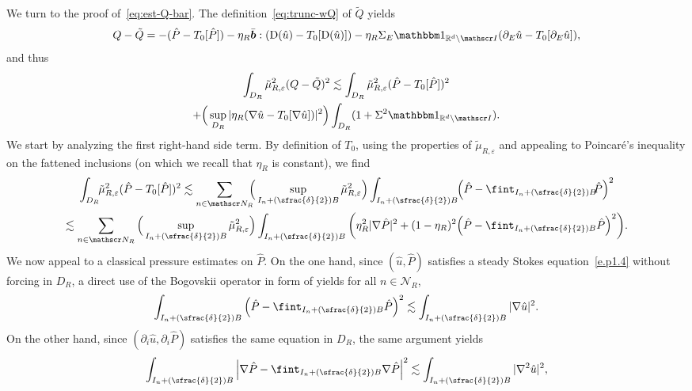 \documentclass[JEP,XML,SOM,Unicode,published]{cedram}
\let\mathcal\mathscr
\newcommand{\Psfrac}[2]{(\sfrac{#1}{#2})}
\let\mathds\mathbbm
\theoremstyle{plain}
\theoremstyle{definition}
\newcommand{\e}{\varepsilon}
\newcommand{\R}{\mathbb R}
\newcommand{\Ic}{\mathcal I}
\newcommand{\Nc}{\mathcal N}
\newcommand{\D}{\operatorname{D}}
\newcommand{\bb}{\bar{\boldsymbol b}}
\begin{document}
We turn to the proof of~\eqref{eq:est-Q-bar}.
The definition~\eqref{eq:trunc-wQ} of $\tilde Q$ yields
\begin{equation*}
Q-\tilde Q=-(\hat P-T_0[\hat P])-\eta_R\bb:(\D(\hat u)- T_0[\D(\hat u)])-\eta_R\Sigma_E\mathds1_{\R^d\setminus\Ic}(\partial_E\hat u-T_0[\partial_E\hat u]),
\end{equation*}
and thus
\begin{multline}\label{e.p1.11+}
\int_{D_R}\tilde\mu_{R,\e}^2(Q-\tilde Q)^2\lesssim \int_{D_R}\tilde\mu_{R,\e}^2(\hat P-T_0[\hat P])^2\\
+\Big(\sup_{D_R}|\eta_R(\nabla\hat u- T_0[\nabla\hat u])|^2\Big)\int_{D_R}(1+\Sigma^2\mathds1_{\R^d\setminus\Ic}).
\end{multline}
We start by analyzing the first right-hand side term. By definition of $T_0$, using the properties of $\tilde\mu_{R,\e}$ and appealing to Poincaré's inequality on the fattened inclusions (on which we recall that $\eta_R$ is constant), we find
\begin{multline}\label{eq:bnd-hatPdiffT0}
\int_{D_R}\hspace*{-1mm}\tilde\mu_{R,\e}^2(\hat P-T_0[\hat P])^2\lesssim \sum_{n\in\Nc_R}\hspace*{-2mm}\Big(\sup_{I_n+\Psfrac\delta2 B}\tilde\mu_{R,\e}^2\Big)\int_{I_n+\Psfrac\delta2 B}\hspace*{-1mm}\Big(\hat P-\fint_{I_n+\Psfrac\delta2 B}\hspace*{-1mm}\hat P\Big)^2\\
\lesssim \sum_{n\in\Nc_R}\Big(\sup_{I_n+\Psfrac\delta2 B}\tilde\mu_{R,\e}^2\Big)\int_{I_n+\Psfrac\delta2 B}\bigg(\eta_R^2|\nabla\hat P|^2+(1-\eta_R)^2\Big(\hat P-\fint_{I_n+\Psfrac\delta2 B}\hat P\Big)^2\bigg).
\end{multline}
We now appeal to a classical pressure estimates on $\hat P$.
On the one hand, since $(\hat u,\hat P)$ satisfies a steady Stokes equation~\eqref{e.p1.4} without forcing in $D_R$, a direct use of the Bogovskii operator in form of \eg \cite[Th.\,III.3.1]{Galdi} yields for all $n\in\Nc_R$,
\begin{equation}\label{eq:bnd-hatPdiff}
\int_{I_n+\Psfrac\delta2 B}\Big(\hat P-\fint_{I_n+\Psfrac\delta2 B} \hat P\Big)^2\lesssim \int_{I_n+\Psfrac\delta2 B}|\nabla \hat u|^2.
\end{equation}
On the other hand, since $(\partial_i\hat u,\partial_i\hat P)$ satisfies the same equation in $D_R$, the same argument yields
\begin{equation*}
\int_{I_n+\Psfrac\delta2 B}\Big|\nabla\hat P-\fint_{I_n+\Psfrac\delta2 B}\nabla \hat P\Big|^2\lesssim \int_{I_n+\Psfrac\delta2 B}|\nabla^2 \hat u|^2,
\end{equation*}
\end{document}
